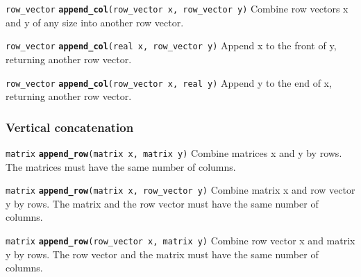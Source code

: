 \documentclass[
  10pt,
]{book}
\begin{document}

\texttt{row\_vector} \textbf{\texttt{append\_col}}\texttt{(row\_vector\ x,\ row\_vector\ y)}\newline
Combine row vectors x and y of any size into another row vector.


\texttt{row\_vector} \textbf{\texttt{append\_col}}\texttt{(real\ x,\ row\_vector\ y)}\newline
Append x to the front of y, returning another row vector.


\texttt{row\_vector} \textbf{\texttt{append\_col}}\texttt{(row\_vector\ x,\ real\ y)}\newline
Append y to the end of x, returning another row vector.

\hypertarget{vertical-concatenation}{%
\subsubsection{Vertical concatenation}\label{vertical-concatenation}}


\texttt{matrix} \textbf{\texttt{append\_row}}\texttt{(matrix\ x,\ matrix\ y)}\newline
Combine matrices x and y by rows. The matrices must have the same
number of columns.


\texttt{matrix} \textbf{\texttt{append\_row}}\texttt{(matrix\ x,\ row\_vector\ y)}\newline
Combine matrix x and row vector y by rows. The matrix and the row
vector must have the same number of columns.


\texttt{matrix} \textbf{\texttt{append\_row}}\texttt{(row\_vector\ x,\ matrix\ y)}\newline
Combine row vector x and matrix y by rows. The row vector and the
matrix must have the same number of columns.
\end{document}
